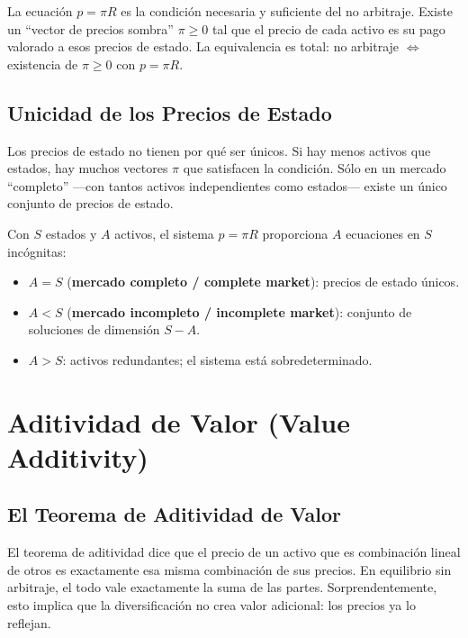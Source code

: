\documentclass[12pt]{article}
\begin{document}
\begin{intuicionmat}
La ecuaci\'on $p = \pi R$ es la condici\'on necesaria y suficiente del no arbitraje. Existe un ``vector de precios sombra'' $\pi \geq 0$ tal que el precio de cada activo es su pago valorado a esos precios de estado. La equivalencia es total: no arbitraje $\Leftrightarrow$ existencia de $\pi \geq 0$ con $p = \pi R$.
\end{intuicionmat}

\subsection{Unicidad de los Precios de Estado}

\begin{intuicion}
Los precios de estado no tienen por qu\'e ser \'unicos. Si hay menos activos que estados, hay muchos vectores $\pi$ que satisfacen la condici\'on. S\'olo en un mercado ``completo'' ---con tantos activos independientes como estados--- existe un \'unico conjunto de precios de estado.
\end{intuicion}

Con $S$ estados y $A$ activos, el sistema $p = \pi R$ proporciona $A$ ecuaciones en $S$ inc\'ognitas:

\begin{itemize}
  \item $A = S$ (\textbf{mercado completo / complete market}): precios de estado \'unicos.
  \item $A < S$ (\textbf{mercado incompleto / incomplete market}): conjunto de soluciones de dimensi\'on $S - A$.
  \item $A > S$: activos redundantes; el sistema est\'a sobredeterminado.
\end{itemize}

\section{Aditividad de Valor (Value Additivity)}

\subsection{El Teorema de Aditividad de Valor}

\begin{intuicion}
El teorema de aditividad dice que el precio de un activo que es combinaci\'on lineal de otros es exactamente esa misma combinaci\'on de sus precios. En equilibrio sin arbitraje, el todo vale exactamente la suma de las partes. Sorprendentemente, esto implica que la diversificaci\'on no crea valor adicional: los precios ya lo reflejan.
\end{intuicion}
\end{document}
